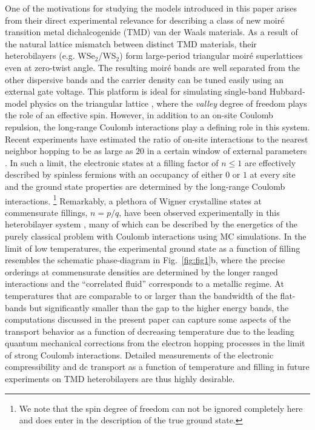 \documentclass[aps,prx,onecolumn,amsmath,nofootinbib,amssymb,11pt]{revtex4-1}
\begin{document}
{One of the motivations for studying the models introduced in this paper arises from their direct experimental relevance for describing a class of new moir\'e transition metal dichalcogenide (TMD) van der Waals materials. As a result of the natural lattice mismatch between distinct TMD materials, their heterobilayers (e.g. WSe$_2$/WS$_2$) form large-period triangular moir\'e superlattices even at zero-twist angle. The resulting moir\'e bands are well separated from the other dispersive bands and the carrier density can be tuned easily using an external gate voltage. This platform is ideal for simulating single-band Hubbard-model physics on the triangular lattice \cite{McDonald2018}, where the {\it valley} degree of freedom plays the role of an effective spin. However, in addition to an on-site Coulomb repulsion, the long-range Coulomb interactions play a defining role in this system. Recent experiments have estimated the ratio of on-site interactions to the nearest neighbor hopping to be as large as $20$ in a certain window of external parameters \cite{JieTMD2020,FengwangTMD2019}.
In such a limit, the electronic states at a filling factor of $n\leq 1$ are effectively described by spinless fermions with an occupancy of either $0$ or $1$ at every site and the ground state properties are determined by the long-range Coulomb interactions. {\footnote{\textsf{We note that the spin degree of freedom can not be ignored completely here and does enter in the description of the true ground state.}}} Remarkably, a plethora of Wigner crystalline states at commensurate fillings, $n=p/q$, have been observed experimentally in this heterobilayer system \cite{xu2020abundance}, many of which can be described by the energetics of the purely classical problem with Coulomb interactions using MC simulations. In the limit of low temperatures, the experimental ground state as a function of filling \cite{xu2020abundance} resembles the schematic phase-diagram in Fig.~\ref{fig:fig1}b, where the precise orderings at commensurate densities are determined by the longer ranged interactions and the ``correlated fluid'' corresponds to a metallic regime. At temperatures that are comparable to or larger than the bandwidth of the flat-bands but significantly smaller than the gap to the higher energy bands, the computations discussed in the present paper can capture some aspects of the transport behavior as a function of decreasing temperature due to the leading quantum mechanical corrections from the electron hopping processes in the limit of strong Coulomb interactions. Detailed measurements of the electronic compressibility and dc transport as a function of temperature and filling in future experiments on TMD heterobilayers are thus highly desirable.   

}
\end{document}
